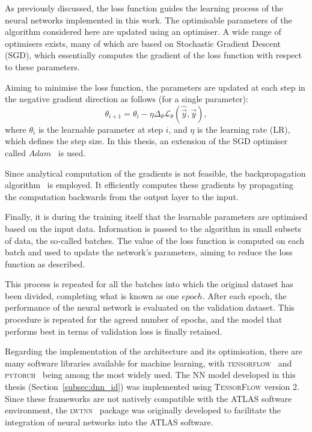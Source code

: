 As previously discussed, the loss function guides the learning process of the neural networks implemented in this work. The optimisable parameters of the algorithm considered here are updated using an optimiser. A wide range of optimisers exists, many of which are based on Stochastic Gradient Descent (SGD), which essentially computes the gradient of the loss function with respect to these parameters.

Aiming to minimise the loss function, the parameters are updated at each step in the negative gradient direction as follows (for a single parameter):
\begin{equation}
    \theta_{i+1} = \theta_{i} - \eta \Delta_{\theta}\mathcal{L}_{\theta}(\hat{\vec{y}},\vec{y}),
\end{equation}
where $\theta_{i}$ is the learnable parameter at step $i$, and $\eta$ is the learning rate (LR), which defines the step size. In this thesis, an extension of the SGD optimiser called $Adam$~\cite{kingma2017adammethodstochasticoptimization} is used.

Since analytical computation of the gradients is not feasible, the backpropagation algorithm~\cite{Rumelhart1986LearningRB} is employed. It efficiently computes these gradients by propagating the computation backwards from the output layer to the input.

Finally, it is during the training itself that the learnable parameters are optimised based on the input data. Information is passed to the algorithm in small subsets of data, the so-called batches. The value of the loss function is computed on each batch and used to update the network's parameters, aiming to reduce the loss function as described.

This process is repeated for all the batches into which the original dataset has been divided, completing what is known as one $epoch$. After each epoch, the performance of the neural network is evaluated on the validation dataset. This procedure is repeated for the agreed number of epochs, and the model that performs best in terms of validation loss is finally retained.

Regarding the implementation of the architecture and its optimisation, there are many software libraries available for machine learning, with \textsc{tensorflow}~\cite{tensorflow2015} and \textsc{pytorch}~\cite{pytorch} being among the most widely used. The NN model developed in this thesis (Section~\ref{subsec:dnn_id}) was implemented using \textsc{TensorFlow} version 2. Since these frameworks are not natively compatible with the ATLAS software environment, the \textsc{lwtnn}~\cite{lwtnn,lwtnn2} package was originally developed to facilitate the integration of neural networks into the ATLAS software.

